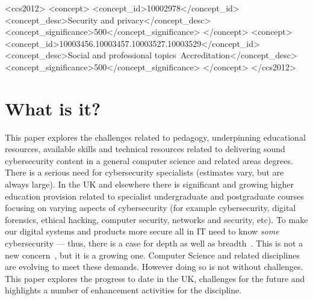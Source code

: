 \documentclass[sigconf]{acmart}
\begin{document}
\begin{CCSXML}
<ccs2012>
<concept>
<concept_id>10002978</concept_id>
<concept_desc>Security and privacy</concept_desc>
<concept_significance>500</concept_significance>
</concept>
<concept>
<concept_id>10003456.10003457.10003527.10003529</concept_id>
<concept_desc>Social and professional topics~Accreditation</concept_desc>
<concept_significance>500</concept_significance>
</concept>
</ccs2012>
\end{CCSXML}





\maketitle


\section {What is it?}

This paper explores the challenges related to pedagogy, underpinning educational resources, available skills and technical resources related to delivering sound cybersecurity content in a general computer science and related areas degrees. There is a serious need for cybersecurity specialists (estimates vary, but are always large). In the UK and elsewhere there is significant and growing higher education provision related to specialist undergraduate and postgraduate courses focusing on varying aspects of cybersecurity (for example cybersecurity, digital forensics, ethical hacking, computer security, networks and security, etc).    To make our digital systems and products more secure all in IT need to know \emph{some} cybersecurity --- thus, there is a case for depth as well as breadth~\cite{manson+pike:2014,davenport-et-al:latice2016}. This is not a new concern~\cite{Parr2014a}, but it is a growing one. Computer Science and related disciplines are evolving to meet these demands. However doing so is not without challenges. This paper explores the progress to date in the UK, challenges for the future and highlights a number of enhancement activities for the discipline.
\end{document}
